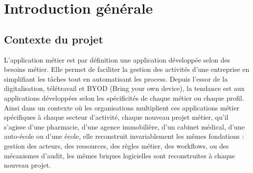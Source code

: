 \chapter{Introduction générale}

\section{Contexte du projet}




L’application métier est par définition une application développée selon des besoins métier. Elle permet de faciliter la gestion des activités d’une entreprise en simplifiant les tâches tout en automatisant les process. Depuis l’essor de la digitalisation, télétravail et BYOD (Bring your own device), la tendance est aux applications développées selon les spécificités de chaque métier ou chaque profil. Ainsi dans un contexte où les organisations multiplient ces applications métier spécifiques à chaque secteur d'activité, chaque nouveau projet métier, qu'il s'agisse d'une pharmacie, d'une agence immobilière, d'un cabinet médical, d'une auto-école ou d'une école, elle reconstruit invariablement les mêmes fondations : gestion des acteurs, des ressources, des règles métier, des workflows, ou des mécanismes d'audit, les mêmes briques logicielles sont reconstruites à chaque nouveau projet.\\

